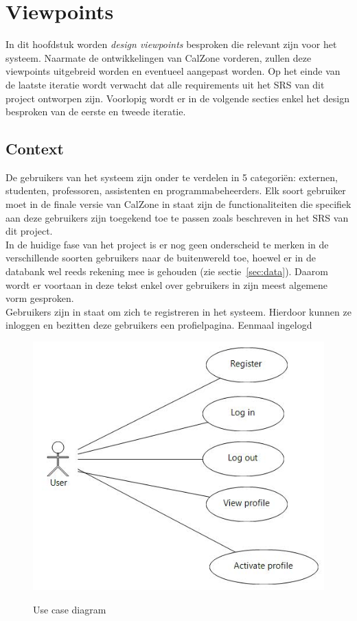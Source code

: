 \chapter{Viewpoints}
\label{chap:viewpoints}

In dit hoofdstuk worden \emph{design viewpoints} besproken die relevant zijn voor het systeem. 
Naarmate de ontwikkelingen van CalZone vorderen, zullen deze viewpoints uitgebreid worden en eventueel aangepast worden. 
Op het einde van de laatste iteratie wordt verwacht dat alle requirements uit het SRS van dit project ontworpen zijn. 
Voorlopig wordt er in de volgende secties enkel het design besproken van de eerste en tweede iteratie.

\section{Context}
\label{sec:context}

De gebruikers van het systeem zijn onder te verdelen in 5 categori\"{e}n: externen, studenten, professoren, assistenten en programmabeheerders. 
Elk soort gebruiker moet in de finale versie van CalZone in staat zijn de functionaliteiten die specifiek aan deze gebruikers zijn toegekend toe te passen zoals beschreven in het SRS van dit project. 
\\
In de huidige fase van het project is er nog geen onderscheid te merken in de verschillende soorten gebruikers naar de buitenwereld toe, hoewel er in de databank wel reeds rekening mee is gehouden (zie sectie~\ref{sec:data}). 
Daarom wordt er voortaan in deze tekst enkel over gebruikers in zijn meest algemene vorm gesproken.
\\
Gebruikers zijn in staat om zich te registreren in het systeem. 
Hierdoor kunnen ze inloggen en bezitten deze gebruikers een profielpagina.
Eenmaal ingelogd  

\begin{figure}[H]
	\centering
	\includegraphics[scale=0.5]{img/use_cases}
	\label{fig:usecase}
	\caption{Use case diagram}
\end{figure}


